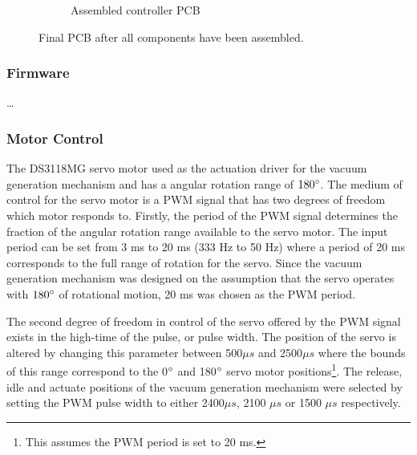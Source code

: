 \begin{figure}[!ht]
\begin{subfigure}{.5\textwidth}
		\caption{Assembled controller PCB}
	\label{fig:assembled-robotic-controller}
	\end{subfigure}%
	\caption{Final PCB after all components have been assembled.}
	\label{fig:pcb-assembly}
\end{figure}



\subsubsection{Firmware}

\ldots

\subsubsection{Motor Control} \label{sec:Motor Control}

The DS3118MG servo motor used as the actuation driver for the vacuum generation mechanism and has a angular rotation range of $180^{\circ}$. The medium of control for the servo motor is a PWM signal that has two degrees of freedom which motor responds to. Firstly, the period of the PWM signal determines the fraction of the angular rotation range available to the servo motor. The input period can be set from 3 ms to 20 ms (333 Hz to 50 Hz) where a period of 20 ms corresponds to the full range of rotation for the servo. Since the vacuum generation mechanism was designed on the assumption that the servo operates with $180^{\circ}$ of rotational motion, 20 ms was chosen as the PWM period.

The second degree of freedom in control of the servo offered by the PWM signal exists in the high-time of the pulse, or pulse width. The position of the servo is altered by changing this parameter between 500$\mu s$ and 2500$\mu s$ where the bounds of this range correspond to the 0$^{\circ}$ and 180$^{\circ}$ servo motor positions\footnote{This assumes the PWM period is set to 20 ms.}. The release, idle and actuate positions of the vacuum generation mechanism were selected by setting the PWM pulse width to either 2400$\mu s$, 2100 $\mu s$ or 1500 $\mu s$ respectively.

